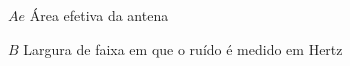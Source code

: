 
\begin{simbolos} \itemsep -1pt
	\item[$ Ae $] Área efetiva da antena
	\item[$ B $] Largura de faixa em que o ruído é medido em Hertz
\end{simbolos}